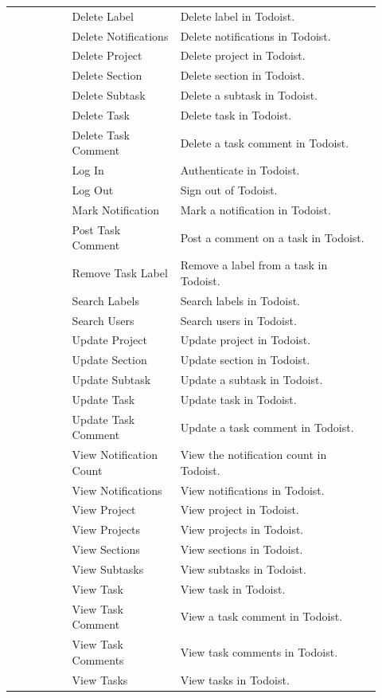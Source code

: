 \documentclass{llmxive}
\begin{document}
\begin{longtable}{@{}p{0.15\linewidth}p{0.27\linewidth}p{0.50\linewidth}@{}}
 & Delete Label & Delete label in Todoist. \\
 & Delete Notifications & Delete notifications in Todoist. \\
 & Delete Project & Delete project in Todoist. \\
 & Delete Section & Delete section in Todoist. \\
 & Delete Subtask & Delete a subtask in Todoist. \\
 & Delete Task & Delete task in Todoist. \\
 & Delete Task Comment & Delete a task comment in Todoist. \\
 & Log In & Authenticate in Todoist. \\
 & Log Out & Sign out of Todoist. \\
 & Mark Notification & Mark a notification in Todoist. \\
 & Post Task Comment & Post a comment on a task in Todoist. \\
 & Remove Task Label & Remove a label from a task in Todoist. \\
 & Search Labels & Search labels in Todoist. \\
 & Search Users & Search users in Todoist. \\
 & Update Project & Update project in Todoist. \\
 & Update Section & Update section in Todoist. \\
 & Update Subtask & Update a subtask in Todoist. \\
 & Update Task & Update task in Todoist. \\
 & Update Task Comment & Update a task comment in Todoist. \\
 & View Notification Count & View the notification count in Todoist. \\
 & View Notifications & View notifications in Todoist. \\
 & View Project & View project in Todoist. \\
 & View Projects & View projects in Todoist. \\
 & View Sections & View sections in Todoist. \\
 & View Subtasks & View subtasks in Todoist. \\
 & View Task & View task in Todoist. \\
 & View Task Comment & View a task comment in Todoist. \\
 & View Task Comments & View task comments in Todoist. \\
 & View Tasks & View tasks in Todoist. \\

\end{longtable}
\end{document}
